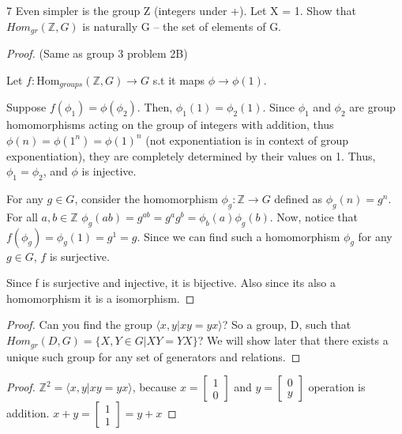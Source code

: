 \documentclass{article}
\newcommand{\Z}{\mathbb{Z}}
\newcommand{\Hom}[0]{\text{Hom}}
\newcommand{\angles}[1]{\langle{#1}\rangle}
\begin{document}
\begin{PROB}{7}\label{Problem 7.}
    Even simpler is the group Z (integers under +). Let X = 1. Show that $Hom_{gr}(\Z,G)$ is naturally G -- the set of elements of G. 
\end{PROB}
\begin{proof}
    (Same as group 3 problem 2B)

    Let $f: \Hom_{groups}(\Z,G) \to G$ s.t it maps $\phi \to \phi(1)$.

    Suppose $f(\phi_1) = \phi(\phi_2)$. Then, $\phi_1(1) = \phi_2(1)$. Since $\phi_1$ and $\phi_2$ are group homomorphisms acting on the group of integers with addition, thus $\phi(n) = \phi(1^n) = \phi(1)^n$ (not exponentiation is in context of group exponentiation), they are completely determined by their values on 1. Thus, $\phi_1 = \phi_2$, and $\phi$ is injective.

    For any $g \in G$, consider the homomorphism $\phi_g: \Z \rightarrow G$ defined as $\phi_g(n) = g^n$. For all $a, b \in \Z$ $\phi_g(ab) = g^{ab} = g^ag^b=\phi_b(a)\phi_g(b)$. Now, notice that $f(\phi_g) = \phi_g(1) = g^1 = g$. Since we can find such a homomorphism $\phi_g$ for any $g \in G$, $f$ is surjective.

    Since f is surjective and injective, it is bijective. Also since its also a homomorphism it is a isomorphism.
\end{proof}

\bigskip

\begin{proof}
    Can you find the group $\angles{x,y| xy = yx}$? So a group, D, such that $Hom_{gr}(D,G) = \{X,Y \in G| XY= YX\}$? We will show later that there exists a unique such group for any set of generators and relations. 
\end{proof}
\begin{proof}
    $\Z^{2} = \angles{x,y| xy = yx}$, because $x = \begin{bmatrix}
        1 \\ 0
    \end{bmatrix}$ and $y = \begin{bmatrix}
        0 \\ y
    \end{bmatrix}$ operation is addition. $x + y = \begin{bmatrix}
        1 \\ 1
    \end{bmatrix} = y + x$
\end{proof}
\end{document}
